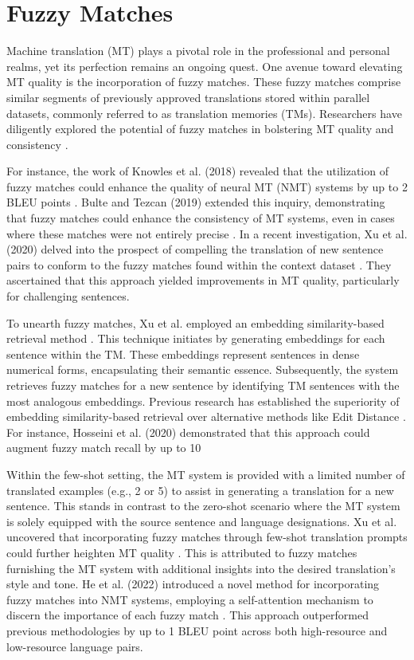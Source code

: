 \documentclass[twocolumn]{article}
\begin{document}
\section{Fuzzy Matches}

Machine translation (MT) plays a pivotal role in the professional and personal realms, yet its perfection remains an ongoing quest. One avenue toward elevating MT quality is the incorporation of fuzzy matches. These fuzzy matches comprise similar segments of previously approved translations stored within parallel datasets, commonly referred to as translation memories (TMs). Researchers have diligently explored the potential of fuzzy matches in bolstering MT quality and consistency \cite{knowles2018fuzzy,bulte2019fuzzy,xu2020forcing}.

For instance, the work of Knowles et al. (2018)\cite{knowles2018comparison} revealed that the utilization of fuzzy matches could enhance the quality of neural MT (NMT) systems by up to 2 BLEU points \cite{knowles2018fuzzy}. Bulte and Tezcan (2019)\cite{bulte2019neural} extended this inquiry, demonstrating that fuzzy matches could enhance the consistency of MT systems, even in cases where these matches were not entirely precise \cite{bulte2019fuzzy}. In a recent investigation, Xu et al. (2020)\cite{xu2020boosting} delved into the prospect of compelling the translation of new sentence pairs to conform to the fuzzy matches found within the context dataset \cite{xu2020forcing}. They ascertained that this approach yielded improvements in MT quality, particularly for challenging sentences.

To unearth fuzzy matches, Xu et al. employed an embedding similarity-based retrieval method \cite{xu2020forcing}. This technique initiates by generating embeddings for each sentence within the TM. These embeddings represent sentences in dense numerical forms, encapsulating their semantic essence. Subsequently, the system retrieves fuzzy matches for a new sentence by identifying TM sentences with the most analogous embeddings. Previous research has established the superiority of embedding similarity-based retrieval over alternative methods like Edit Distance \cite{hosseini2020embedding}. For instance, Hosseini et al. (2020)\cite{hosseini2020deezymatch} demonstrated that this approach could augment fuzzy match recall by up to 10%

Within the few-shot setting, the MT system is provided with a limited number of translated examples (e.g., 2 or 5) to assist in generating a translation for a new sentence. This stands in contrast to the zero-shot scenario where the MT system is solely equipped with the source sentence and language designations. Xu et al. uncovered that incorporating fuzzy matches through few-shot translation prompts could further heighten MT quality \cite{xu2020boosting}. This is attributed to fuzzy matches furnishing the MT system with additional insights into the desired translation's style and tone. He et al. (2022) introduced a novel method for incorporating fuzzy matches into NMT systems, employing a self-attention mechanism to discern the importance of each fuzzy match \cite{he2022incorporating}. This approach outperformed previous methodologies by up to 1 BLEU point across both high-resource and low-resource language pairs.
\end{document}
